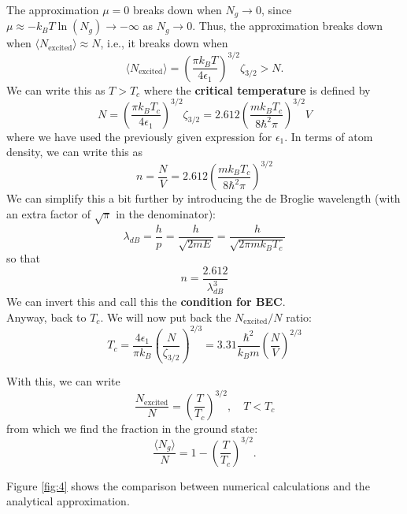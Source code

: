 \documentclass{book}
\theoremstyle{definition}
\newcommand{\f}[2]{\frac{#1}{#2}}
\newcommand{\lp}{\left(}
\newcommand{\rp}{\right)}
\begin{document}
The approximation $\mu=0$ breaks down when $N_g \to 0$, since $\mu \approx -k_B T \ln (N_g)\to -\infty$ as $N_g \to 0$. Thus, the approximation breaks down when $\langle N_{\text{excited}}\rangle \approx N$, i.e., it breaks down when 
\begin{equation*}
\langle N_{\text{excited}} \rangle =\lp \f{\pi k_B T}{4\epsilon_1} \rp^{3/2} \zeta_{3/2} > N.
\end{equation*} 
We can write this as $T>T_c$ where the \textbf{critical temperature} is defined by 
\begin{equation*}
\boxed{N = \lp \f{\pi k_B T_c}{4\epsilon_1} \rp^{3/2} \zeta_{3/2} = 2.612 \lp \f{mk_B T_c}{8\hbar^2 \pi} \rp^{3/2} V}
\end{equation*}
where we have used the previously given expression for $\epsilon_1$. In terms of atom density, we can write this as 
\begin{equation*}
\boxed{n = \f{N}{V} = 2.612 \lp \f{mk_B T_c}{8 \hbar^2 \pi} \rp^{3/2}}
\end{equation*}
We can simplify this a bit further by introducing the de Broglie wavelength (with an extra factor of $\sqrt{\pi}$ in the denominator):
\begin{equation*}
\lambda_{dB} = \f{h}{p} = \f{h}{\sqrt{2m E}} = \f{h}{\sqrt{2\pi m k_B T_c}}
\end{equation*}
so that 
\begin{equation*}
\boxed{n = \f{2.612}{\lambda_{dB}^3}}
\end{equation*}
We can invert this and call this the \textbf{condition for BEC}. \\



Anyway, back to $T_c$. We will now put back the $N_{\text{excited}}/N$  ratio:
\begin{equation*}
\boxed{T_c = \f{4\epsilon_1}{\pi k_B} \lp \f{N}{\zeta_{3/2}} \rp^{2/3} = 3.31 \f{\hbar^2}{k_B m} \lp \f{N}{V} \rp^{2/3}  }
\end{equation*}


With this, we can write
\begin{equation*}
\f{N_\text{excited}}{N} = \lp \f{T}{T_c} \rp^{3/2}, \quad T < T_c
\end{equation*}
from which we find the fraction in the ground state: 
\begin{equation*}
\f{\langle N_g \rangle}{N} = 1-  \lp \f{T}{T_c} \rp^{3/2}.
\end{equation*}

Figure \ref{fig:4} shows the comparison between numerical calculations and the analytical approximation.
\end{document}
